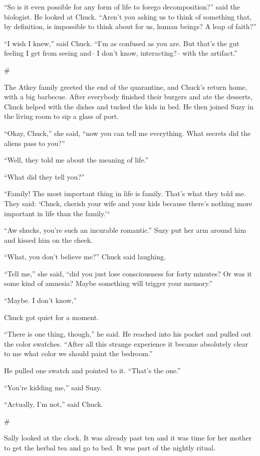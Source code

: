 \documentclass[12pt]{book}
\newcommand{\sbreak}{
\begin{center}
  \#
\end{center}
}
\begin{document}
``So is it even possible for any form of life to forego decomposition?'' said the biologist. He looked at Chuck. ``Aren't you asking us to think of something that, by definition, is impossible to think about for us, human beings? A leap of faith?''

``I wish I knew,'' said Chuck. ``I'm as confused as you are. But that's the gut feeling I get from seeing and-- I don't know, interacting?-- with the artifact.''


\sbreak

The Atkey family greeted the end of the quarantine, and Chuck's return home, with a big barbecue. After everybody finished their burgers and ate the desserts, Chuck helped with the dishes and tucked the kids in bed. He then joined Suzy in the living room to sip a glass of port. 

``Okay, Chuck,'' she said, ``now you can tell me everything. What secrets did the aliens pass to you?''

``Well, they told me about the meaning of life.''

``What did they tell you?''

``Family! The most important thing in life is family. That's what they told me. They said: `Chuck, cherish your wife and your kids because there's nothing more important in life than the family.'``

``Aw shucks, you're such an incurable romantic.'' Suzy put her arm around him and kissed him on the cheek.

``What, you don't believe me?'' Chuck said laughing.

``Tell me,'' she said, ``did you just lose consciousness for forty minutes? Or was it some kind of amnesia? Maybe something will trigger your memory.''

``Maybe. I don't know,'' 

Chuck got quiet for a moment. 

``There is one thing, though,'' he said. He reached into his pocket and pulled out the color swatches. ``After all this strange experience it became absolutely clear to me what color we should paint the bedroom.'' 

He pulled one swatch and pointed to it. ``That's the one.''

``You're kidding me,'' said Suzy.

``Actually, I'm not,'' said Chuck.

\sbreak

Sally looked at the clock. It was already past ten and it was time for her mother to get the herbal tea and go to bed. It was part of the nightly ritual.
\end{document}
